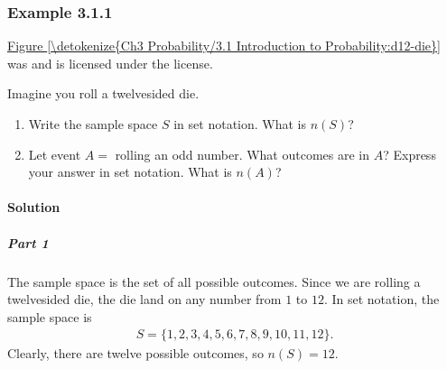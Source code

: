 \documentclass[letterpaper,10pt,english]{jupyterBook}
\begin{document}
\subsubsection{Example 3.1.1}
\label{\detokenize{Ch3 Probability/3.1 Introduction to Probability:example-3-1-1}}
\begin{sphinxShadowBox}
\sphinxstylesidebartitle{}

\begin{center}
\noindent{}
\label{\detokenize{Ch3 Probability/3.1 Introduction to Probability:d12-die}}\end{center}
%
\begin{footnotetext}[1]\sphinxAtStartFootnote
\hyperref[\detokenize{Ch3 Probability/3.1 Introduction to Probability:d12-die}]{Figure \ref{\detokenize{Ch3 Probability/3.1 Introduction to Probability:d12-die}}} was  and is licensed under the  license.
%
\end{footnotetext}\ignorespaces \end{sphinxShadowBox}

\sphinxAtStartPar
Imagine you roll a twelve\sphinxhyphen{}sided die.
\begin{enumerate}
%
\item {} 
\sphinxAtStartPar
Write the sample space \(S\) in set notation. What is \(n(S)\)?

\item {} 
\sphinxAtStartPar
Let event \(A = \) rolling an odd number. What outcomes are in \(A\)? Express your answer in set notation. What is \(n(A)\)?

\end{enumerate}


\paragraph{Solution}
\label{\detokenize{Ch3 Probability/3.1 Introduction to Probability:solution}}

\subparagraph{Part 1}
\label{\detokenize{Ch3 Probability/3.1 Introduction to Probability:part-1}}
\sphinxAtStartPar
The sample space is the set of all possible outcomes. Since we are rolling a twelve\sphinxhyphen{}sided die, the die land on any number from \(1\) to \(12\). In set notation, the sample space is
\begin{equation*}
\begin{split} S = \{1, 2, 3, 4, 5, 6, 7, 8, 9, 10, 11, 12\}. \end{split}
\end{equation*}
\sphinxAtStartPar
Clearly, there are twelve possible outcomes, so \(n(S) = 12\).
\end{document}
